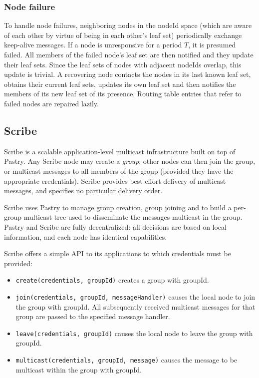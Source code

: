 \documentclass[a4paper,12pt]{article}
\begin{document}
\subsubsection{Node failure}
To handle node failures, neighboring nodes in the nodeId space (which are aware of each other by virtue of being in each other’s leaf set) periodically exchange keep-alive messages. If a node is unresponsive for a period $T$, it is presumed failed. All members of the failed node’s leaf set are then notified and they update their leaf sets. Since the leaf sets of nodes with adjacent nodeIds overlap, this update is trivial. A recovering node contacts the nodes in its last known leaf set, obtains their current leaf sets, updates its own leaf set and then notifies the members of its new leaf set of its presence. Routing table entries that refer to failed nodes are repaired lazily.

\subsection{Scribe}
Scribe is a scalable application-level multicast infrastructure built on top of Pastry. Any Scribe node may create a \textit{group}; other nodes can then join the group, or multicast messages to all members of the group (provided they have the appropriate credentials). Scribe provides best-effort delivery of multicast messages, and specifies no particular delivery order.

Scribe uses Pastry to manage group creation, group joining and to build a per-group multicast tree used to disseminate the messages multicast in the group. Pastry and Scribe are fully decentralized: all decisions are based on local information, and each node has identical capabilities.

Scribe offers a simple API to its applications to which credentials must be provided:
\begin{itemize}
	\item \texttt{create(credentials, groupId)} creates a group with groupId.
	\item \texttt{join(credentials, groupId, messageHandler)} causes the local node to join the group with groupId. All subsequently received multicast messages for that group are passed to the specified message handler.
	\item \texttt{leave(credentials, groupId)} causes the local node to leave the group with groupId.
	\item \texttt{multicast(credentials, groupId, message)} causes the message to be multicast within the group with groupId.
\end{itemize}
\end{document}
